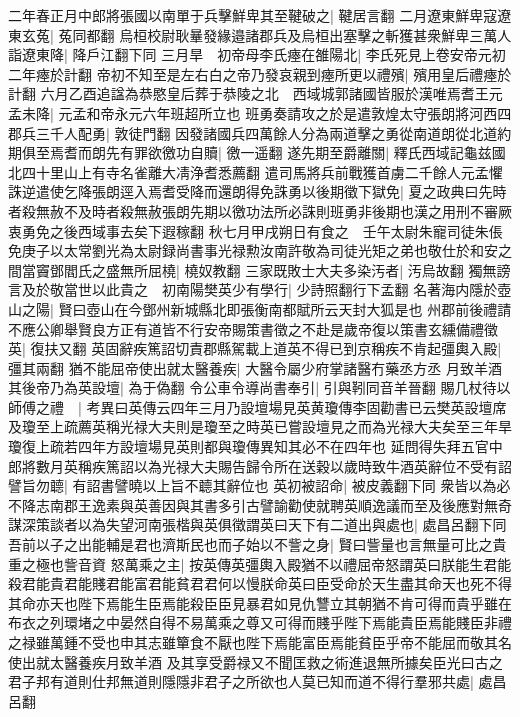 二年春正月中郎將張國以南單于兵擊鮮卑其至鞬破之|{
	鞬居言翻}
二月遼東鮮卑寇遼東玄菟|{
	菟同都翻}
烏桓校尉耿曅發緣邉諸郡兵及烏桓出塞擊之斬獲甚衆鮮卑三萬人詣遼東降|{
	降戶江翻下同}
三月旱　初帝母李氏瘞在雒陽北|{
	李氏死見上卷安帝元初二年瘞於計翻}
帝初不知至是左右白之帝乃發哀親到瘞所更以禮殯|{
	殯用皇后禮瘞於計翻}
六月乙酉追諡為恭愍皇后葬于恭陵之北　西域城郭諸國皆服於漢唯焉耆王元孟未降|{
	元孟和帝永元六年班超所立也}
班勇奏請攻之於是遣敦煌太守張朗將河西四郡兵三千人配勇|{
	敦徒門翻}
因發諸國兵四萬餘人分為兩道擊之勇從南道朗從北道約期俱至焉耆而朗先有罪欲徼功自贖|{
	徼一遥翻}
遂先期至爵離關|{
	釋氏西域記龜兹國北四十里山上有寺名雀離大凊浄耆悉薦翻}
遣司馬將兵前戰獲首虜二千餘人元孟懼誅逆遣使乞降張朗逕入焉耆受降而還朗得免誅勇以後期徵下獄免|{
	夏之政典曰先時者殺無赦不及時者殺無赦張朗先期以徼功法所必誅則班勇非後期也漢之用刑不審厥衷勇免之後西域事去矣下遐稼翻}
秋七月甲戌朔日有食之　壬午太尉朱寵司徒朱倀免庚子以太常劉光為太尉録尚書事光禄勲汝南許敬為司徒光矩之弟也敬仕於和安之間當竇鄧閻氏之盛無所屈橈|{
	橈奴教翻}
三家既敗士大夫多染汚者|{
	汚烏故翻}
獨無謗言及於敬當世以此貴之　初南陽樊英少有學行|{
	少詩照翻行下孟翻}
名著海内隱於壺山之陽|{
	賢曰壺山在今鄧州新城縣北即張衡南都賦所云天封大狐是也}
州郡前後禮請不應公卿舉賢良方正有道皆不行安帝賜策書徵之不赴是歲帝復以策書玄纁備禮徵英|{
	復扶又翻}
英固辭疾篤詔切責郡縣駕載上道英不得已到京稱疾不肯起彊輿入殿|{
	彊其兩翻}
猶不能屈帝使出就太醫養疾|{
	大醫令屬少府掌諸醫冇藥丞方丞}
月致羊酒其後帝乃為英設壇|{
	為于偽翻}
令公車令導尚書奉引|{
	引與靷同音羊晉翻}
賜几杖待以師傅之禮　|{
	考異曰英傳云四年三月乃設壇場見英黄瓊傳李固勸書已云樊英設壇席及瓊至上疏薦英稱光禄大夫則是瓊至之時英已嘗設壇見之而為光禄大夫矣至三年旱瓊復上疏若四年方設壇場見英則都與瓊傳異知其必不在四年也}
延問得失拜五官中郎將數月英稱疾篤詔以為光禄大夫賜告歸令所在送穀以歲時致牛酒英辭位不受有詔譬旨勿聼|{
	有詔書譬曉以上旨不聼其辭位也}
英初被詔命|{
	被皮義翻下同}
衆皆以為必不降志南郡王逸素與英善因與其書多引古譬諭勸使就聘英順逸議而至及後應對無奇謀深策談者以為失望河南張楷與英俱徵謂英曰天下有二道出與處也|{
	處昌呂翻下同}
吾前以子之出能輔是君也濟斯民也而子始以不訾之身|{
	賢曰訾量也言無量可比之貴重之極也訾音資}
怒萬乘之主|{
	按英傳英彊輿入殿猶不以禮屈帝怒謂英曰朕能生君能殺君能貴君能賤君能富君能貧君君何以慢朕命英曰臣受命於天生盡其命天也死不得其命亦天也陛下焉能生臣焉能殺臣臣見暴君如見仇讐立其朝猶不肯可得而貴乎雖在布衣之列環堵之中晏然自得不易萬乘之尊又可得而賤乎陛下焉能貴臣焉能賤臣非禮之禄雖萬鍾不受也申其志雖簞食不厭也陛下焉能富臣焉能貧臣乎帝不能屈而敬其名使出就太醫養疾月致羊酒}
及其享受爵禄又不聞匡救之術進退無所據矣臣光曰古之君子邦有道則仕邦無道則隱隱非君子之所欲也人莫已知而道不得行羣邪共處|{
	處昌呂翻}
